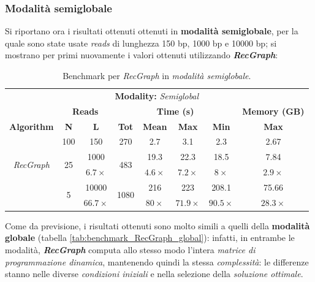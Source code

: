 \subsubsection{Modalità semiglobale}
    Si riportano ora i risultati ottenuti ottenuti in \textbf{modalità semiglobale}, per la quale sono state usate \emph{reads} di lunghezza 150 bp, 1000 bp e 10000 bp; si mostrano per primi nuovamente i valori ottenuti utilizzando \textbf{\textit{RecGraph}}:
    \vspace{20pt}
    \begin{table}[h]
        \centering
        \begin{tabular}{|c|c|c|c|c|c|c|c|}
            \hline
                \multicolumn{8}{|c|}{\multirow{2}{*}{\textbf{Modality:} \emph{Semiglobal}}} \\
                \multicolumn{8}{|c|}{} \\
            \hline
                & \multicolumn{2}{|c|}{\textbf{Reads}} & \multicolumn{4}{|c|}{\textbf{Time (s)}} & \textbf{Memory (GB)} \\
            \hline
                \textbf{Algorithm} & \textbf{N} & \textbf{L} & \textbf{Tot} & \textbf{Mean} & \textbf{Max} &  \textbf{Min} & \textbf{Max} \\
            \hline
                \multirow{4}{*}{\emph{RecGraph}} & 100 & 150 & 270 & 2.7 & 3.1 & 2.3 & 2.67 \\
            \cline{2-8}
                & \multirow{2}{*}{25} & 1000 & \multirow{2}{*}{483} & 19.3 & 22.3 & 18.5 & 7.84 \\
                & & $6.7 \times$ & & $4.6 \times$ & $7.2 \times$ & $8 \times$ & $2.9 \times$ \\
            \cline{2-8}
                & \multirow{2}{*}{5} & 10000 & \multirow{2}{*}{1080} & 216 & 223 & 208.1 & 75.66 \\
                & & $66.7 \times$ & & $80 \times$ & $71.9 \times$ & $90.5 \times$ & $28.3 \times$ \\
            \hline
        \end{tabular}
        \caption{Benchmark per \emph{RecGraph} in \emph{modalità semiglobale}.}
        \label{tab:benchmark_RecGraph_semiglobal}
    \end{table}
    \vspace{20pt}
    
    Come da previsione, i risultati ottenuti sono molto simili a quelli della \textbf{modalità globale} (tabella \ref{tab:benchmark_RecGraph_global}): infatti, in entrambe le modalità, \textbf{\textit{RecGraph}} computa allo stesso modo l'intera \emph{matrice di programmazione dinamica}, mantenendo quindi la stessa \emph{complessità}: le differenze stanno nelle diverse \emph{condizioni iniziali} e nella selezione della \emph{soluzione ottimale}.
    
